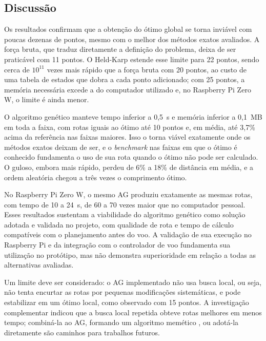 \subsection{Discussão}\label{subsec:res_rotas_discussao}

Os resultados confirmam que a obtenção do ótimo global se torna inviável com poucas dezenas de pontos, mesmo com o melhor dos métodos exatos avaliados. A força bruta, que traduz diretamente a definição do problema, deixa de ser praticável com 11 pontos. O Held-Karp estende esse limite para 22 pontos, sendo cerca de $10^{11}$ vezes mais rápido que a força bruta com 20 pontos, ao custo de uma tabela de estados que dobra a cada ponto adicionado; com 25 pontos, a memória necessária excede a do computador utilizado e, no Raspberry Pi Zero W, o limite é ainda menor.

O algoritmo genético manteve tempo inferior a 0,5~s e memória inferior a 0,1~MB em toda a faixa, com rotas iguais ao ótimo até 10 pontos e, em média, até 3,7\% acima da referência nas faixas maiores. Isso o torna viável exatamente onde os métodos exatos deixam de ser, e o \textit{benchmark} nas faixas em que o ótimo é conhecido fundamenta o uso de sua rota quando o ótimo não pode ser calculado. O guloso, embora mais rápido, perdeu de 6\% a 18\% de distância em média, e a ordem aleatória chegou a três vezes o comprimento ótimo.

No Raspberry Pi Zero W, o mesmo AG produziu exatamente as mesmas rotas, com tempo de 10 a 24~s, de 60 a 70 vezes maior que no computador pessoal. Esses resultados sustentam a viabilidade do algoritmo genético como solução adotada e validada no projeto, com qualidade de rota e tempo de cálculo compatíveis com o planejamento antes do voo. A validação de sua execução no Raspberry Pi e da integração com o controlador de voo fundamenta sua utilização no protótipo, mas não demonstra superioridade em relação a todas as alternativas avaliadas.

Um limite deve ser considerado: o AG implementado não usa busca local, ou seja, não tenta encurtar as rotas por pequenas modificações sistemáticas, e pode estabilizar em um ótimo local, como observado com 15 pontos. A investigação complementar indicou que a busca local repetida obteve rotas melhores em menos tempo; combiná-la ao AG, formando um algoritmo memético \cite{moscato1989}, ou adotá-la diretamente são caminhos para trabalhos futuros.
